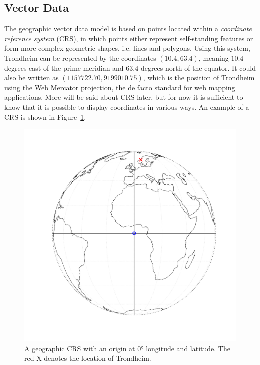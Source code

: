 \subsection{Vector Data}
The geographic vector data model is based on points located within a \textit{coordinate reference system} (CRS), in which points either represent self-standing features or form more complex geometric shapes, i.e. lines and polygons. Using this system, Trondheim can be represented by the coordinates $\left(10.4, 63.4\right)$, meaning $10.4$ degrees east of the prime meridian and $63.4$ degrees north of the equator. It could also be written as $\left(1157722.70, 9199010.75\right)$, which is the position of Trondheim using the Web Mercator projection, the de facto standard for web mapping applications. More will be said about CRS later, but for now it is sufficient to know that it is possible to display coordinates in various ways. An example of a CRS is shown in Figure~\ref{fig:globe}.
\begin{figure}[H]
   \centering
       \includegraphics[page=1,width=.7\textwidth]{globe.pdf}
 \caption{A geographic CRS with an origin at 0° longitude and latitude. The red X denotes the location of Trondheim.}
 \label{fig:globe}
\end{figure}
